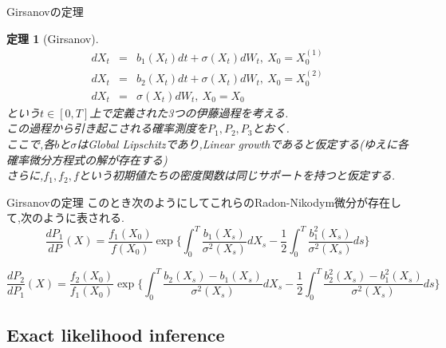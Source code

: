 \documentclass[dvipdfmx,cjk]{beamer}
\numberwithin{equation}{section}
\newtheorem{Thm}     {定理}[section]
\def\thm{\begin{Thm}}
\def\thmx{\end{Thm}}
\def\eqa{\begin{eqnarray}}
\def\eqax{\end{eqnarray}}
\begin{document}
\begin{frame}{Girsanovの定理}
\thm[Girsanov]
\eqa
dX_t &=& b_1(X_t) dt + \sigma(X_t) dW_t ,\ X_0 = X_0^{(1)} \\
dX_t &=& b_2(X_t) dt + \sigma(X_t) dW_t ,\ X_0 = X_0^{(2)} \\
dX_t &=& \sigma(X_t) dW_t ,\ X_0 = X_0
\eqax
という$t\in [0,T]$上で定義された3つの伊藤過程を考える.\\
この過程から引き起こされる確率測度を$P_1,P_2,P_3$とおく.\\
ここで,各$b$と$\sigma$はGlobal Lipschitzであり,Linear growthであると仮定する(ゆえに各確率微分方程式の解が存在する)\\
さらに,$f_1,f_2,f$という初期値たちの密度関数は同じサポートを持つと仮定する.\\

\thmx

\end{frame}
\begin{frame}{Girsanovの定理}
このとき次のようにしてこれらのRadon-Nikodym微分が存在して,次のように表される.
\[
\frac{dP_1}{dP}(X) = \frac{f_1(X_0)}{f(X_0)} 
\exp \biggl\{
	\int_0^T \frac{b_1(X_s)}{\sigma^2(X_s)} dX_s - 
	\frac{1}{2} \int_0^T \frac{ b_1^2(X_s) }{\sigma^2(X_s)} ds
	 \biggl\}
\]

\[
\frac{dP_2}{dP_1}(X) = \frac{f_2(X_0)}{f_1(X_0)} 
\exp \biggl\{
	\int_0^T \frac{b_2(X_s)-b_1(X_s)}{\sigma^2(X_s)} dX_s - 
	\frac{1}{2} \int_0^T \frac{b_2^2(X_s)- b_1^2(X_s) }{\sigma^2(X_s)} ds
	 \biggl\}
\]
\end{frame}


\subsection{Exact likelihood inference}
\end{document}
